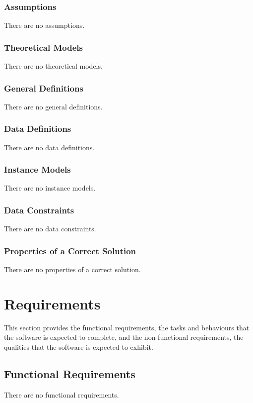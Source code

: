 \documentclass[12pt]{article}
\begin{document}
\subsubsection{Assumptions}
\label{Sec:Assumps}
There are no assumptions.

\subsubsection{Theoretical Models}
\label{Sec:TMs}
There are no theoretical models.

\subsubsection{General Definitions}
\label{Sec:GDs}
There are no general definitions.

\subsubsection{Data Definitions}
\label{Sec:DDs}
There are no data definitions.

\subsubsection{Instance Models}
\label{Sec:IMs}
There are no instance models.

\subsubsection{Data Constraints}
\label{Sec:DataConstraints}
There are no data constraints.

\subsubsection{Properties of a Correct Solution}
\label{Sec:CorSolProps}
There are no properties of a correct solution.

\section{Requirements}
\label{Sec:Requirements}
This section provides the functional requirements, the tasks and behaviours that the software is expected to complete, and the non-functional requirements, the qualities that the software is expected to exhibit.

\subsection{Functional Requirements}
\label{Sec:FRs}
There are no functional requirements.
\end{document}
